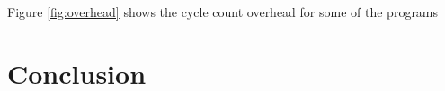 Figure \ref{fig:overhead} shows the cycle count overhead for some of the programs 

\section{Conclusion}





